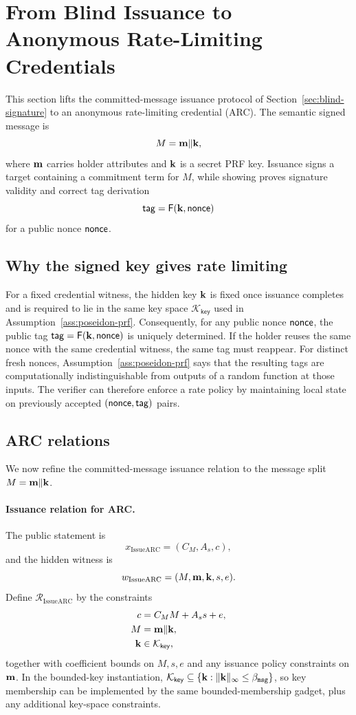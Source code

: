 \section{From Blind Issuance to Anonymous Rate-Limiting Credentials}
\label{sec:arc-construction}

This section lifts the committed-message issuance protocol of Section~\ref{sec:blind-signature} to an anonymous
rate-limiting credential (ARC).  The semantic signed message is
\[
  M=\mathbf{m}\Vert\mathbf{k},
\]
where \(\mathbf{m}\) carries holder attributes and \(\mathbf{k}\) is a secret PRF key.  Issuance signs a target containing a
commitment term for \(M\), while showing proves signature validity and correct tag derivation
\[
  \mathsf{tag}=\mathsf{F}(\mathbf{k},\mathsf{nonce})
\]
for a public nonce \(\mathsf{nonce}\).

\subsection{Why the signed key gives rate limiting}
For a fixed credential witness, the hidden key \(\mathbf{k}\) is fixed once issuance completes and is required to lie in
the same key space \(\mathcal K_{\mathsf{key}}\) used in Assumption~\ref{ass:poseidon-prf}.  Consequently, for
any public nonce \(\mathsf{nonce}\), the public tag \(\mathsf{tag}=\mathsf{F}(\mathbf{k},\mathsf{nonce})\) is uniquely determined.  If the holder
reuses the same nonce with the same credential witness, the same tag must reappear.  For distinct fresh nonces,
Assumption~\ref{ass:poseidon-prf} says that the resulting tags are computationally indistinguishable from outputs
of a random function at those inputs.  The verifier can therefore enforce a rate policy by maintaining local state
on previously accepted \((\mathsf{nonce},\mathsf{tag})\) pairs.

\subsection{ARC relations}
We now refine the committed-message issuance relation to the message split \(M=\mathbf{m}\Vert\mathbf{k}\).

\paragraph{Issuance relation for ARC.}
The public statement is
\[
  x_{\mathrm{IssueARC}}=(C_M,A_s,c),
\]
and the hidden witness is
\[
  w_{\mathrm{IssueARC}}=(M,\mathbf{m},\mathbf{k},s,e).
\]
Define \(\mathcal R_{\mathrm{IssueARC}}\) by the constraints
\begin{align}
  c&=C_MM+A_s s+e, \label{eq:issuearc-rel-commit}\\
  M&=\mathbf{m}\Vert\mathbf{k}, \label{eq:issuearc-rel-encoding}\\
  \mathbf{k}&\in\mathcal K_{\mathsf{key}}, \label{eq:issuearc-rel-key}
\end{align}
together with coefficient bounds on \(M,s,e\) and any issuance policy constraints on \(\mathbf{m}\).  In the bounded-key
instantiation, \(\mathcal K_{\mathsf{key}}\subseteq\{\mathbf{k}:\|\mathbf{k}\|_\infty\le\beta_{\mathtt{msg}}\}\), so key membership can be
implemented by the same bounded-membership gadget, plus any additional key-space constraints.

